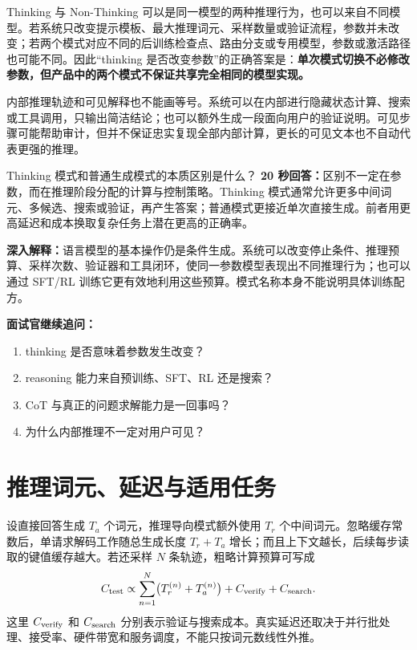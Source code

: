 Thinking 与 Non-Thinking 可以是同一模型的两种推理行为，也可以来自不同模型。若系统只改变提示模板、最大推理词元、采样数量或验证流程，参数并未改变；若两个模式对应不同的后训练检查点、路由分支或专用模型，参数或激活路径也可能不同。因此“thinking 是否改变参数”的正确答案是：\textbf{单次模式切换不必修改参数，但产品中的两个模式不保证共享完全相同的模型实现。}

内部推理轨迹和可见解释也不能画等号。系统可以在内部进行隐藏状态计算、搜索或工具调用，只输出简洁结论；也可以额外生成一段面向用户的验证说明。可见步骤可能帮助审计，但并不保证忠实复现全部内部计算，更长的可见文本也不自动代表更强的推理。

\begin{interviewbox}{Thinking 模式和普通生成模式的本质区别是什么？}
\textbf{20 秒回答：}区别不一定在参数，而在推理阶段分配的计算与控制策略。Thinking 模式通常允许更多中间词元、多候选、搜索或验证，再产生答案；普通模式更接近单次直接生成。前者用更高延迟和成本换取复杂任务上潜在更高的正确率。

\textbf{深入解释：}语言模型的基本操作仍是条件生成。系统可以改变停止条件、推理预算、采样次数、验证器和工具闭环，使同一参数模型表现出不同推理行为；也可以通过 SFT/RL 训练它更有效地利用这些预算。模式名称本身不能说明具体训练配方。

\textbf{面试官继续追问：}
\begin{enumerate}
  \item thinking 是否意味着参数发生改变？
  \item reasoning 能力来自预训练、SFT、RL 还是搜索？
  \item CoT 与真正的问题求解能力是一回事吗？
  \item 为什么内部推理不一定对用户可见？
\end{enumerate}
\end{interviewbox}

\section{推理词元、延迟与适用任务}

设直接回答生成 $T_a$ 个词元，推理导向模式额外使用 $T_r$ 个中间词元。忽略缓存常数后，单请求解码工作随总生成长度 $T_r+T_a$ 增长；而且上下文越长，后续每步读取的键值缓存越大。若还采样 $N$ 条轨迹，粗略计算预算可写成
\[
C_{\rm test}\propto
\sum_{n=1}^{N}\bigl(T_r^{(n)}+T_a^{(n)}\bigr)
+C_{\rm verify}+C_{\rm search}.
\]
这里 $C_{\rm verify}$ 和 $C_{\rm search}$ 分别表示验证与搜索成本。真实延迟还取决于并行批处理、接受率、硬件带宽和服务调度，不能只按词元数线性外推。

